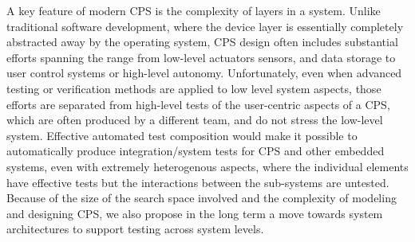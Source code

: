A key feature of modern CPS is the complexity of layers in a system.  Unlike traditional software development, where the device layer is essentially completely abstracted away by the operating system, CPS design often includes substantial efforts spanning the range from low-level actuators sensors, and data storage to user control systems or high-level autonomy.  Unfortunately, even when advanced testing or verification methods are applied to low level system aspects, those efforts are separated from high-level tests of the user-centric aspects of a CPS, which are often produced by a different team, and do not stress the low-level system.  Effective automated test composition
would make it possible to automatically produce integration/system tests for
CPS and other embedded systems, even with extremely heterogenous aspects, where the individual elements have
effective tests but the interactions between the sub-systems are untested.  Because of the size of the search space involved and the complexity of modeling and designing CPS, we also propose in the long term a move towards system architectures to support testing across system levels.

